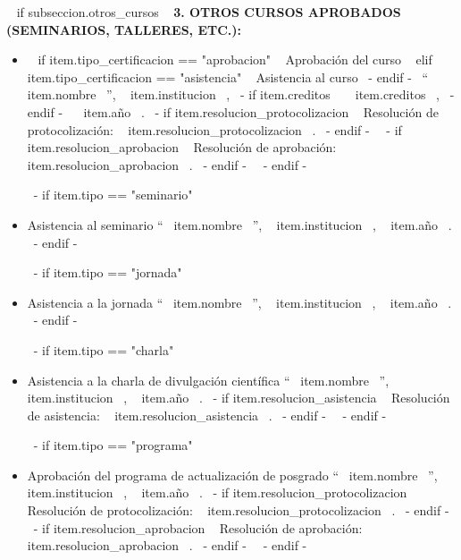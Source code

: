     ~{ if subseccion.otros_cursos }~
      \textbf{3. OTROS CURSOS APROBADOS (SEMINARIOS, TALLERES, ETC.):}
      \begin{itemize}
      ~{ for item in subseccion.otros_cursos }~
        ~{- if item.tipo == "curso" }~
          \item ~{ if item.tipo_certificacion == "aprobacion" }~ Aprobación del curso ~{ elif item.tipo_certificacion == "asistencia" }~ Asistencia al curso ~{- endif -}~
                ``~{{ item.nombre }}~'', ~{{ item.institucion }}~,
                ~{- if item.creditos }~ ~{{ item.creditos }}~, ~{- endif -}~
                ~{{ item.año }}~.
                ~{- if item.resolucion_protocolizacion }~ Resolución de protocolización: ~{{ item.resolucion_protocolizacion }}~. ~{- endif -}~
                ~{- if item.resolucion_aprobacion }~ Resolución de aprobación: ~{{ item.resolucion_aprobacion }}~. ~{- endif -}~
          \espacioEntreItems{}
        ~{- endif -}~

        ~{- if item.tipo == "seminario" }~
          \item Asistencia al seminario ``~{{ item.nombre }}~'', ~{{ item.institucion }}~, ~{{ item.año }}~.
          \espacioEntreItems{}
        ~{- endif -}~

        ~{- if item.tipo == "jornada" }~
          \item Asistencia a la jornada ``~{{ item.nombre }}~'', ~{{ item.institucion }}~, ~{{ item.año }}~.
          \espacioEntreItems{}
        ~{- endif -}~

        ~{- if item.tipo == "charla" }~
          \item Asistencia a la charla de divulgación científica ``~{{ item.nombre }}~'', ~{{ item.institucion }}~, ~{{ item.año }}~.
                ~{- if item.resolucion_asistencia }~ Resolución de asistencia: ~{{ item.resolucion_asistencia }}~. ~{- endif -}~
          \espacioEntreItems{}
        ~{- endif -}~

        ~{- if item.tipo == "programa" }~
          \item Aprobación del programa de actualización de posgrado ``~{{ item.nombre }}~'', ~{{ item.institucion }}~, ~{{ item.año }}~.
                ~{- if item.resolucion_protocolizacion }~ Resolución de protocolización: ~{{ item.resolucion_protocolizacion }}~. ~{- endif -}~
                ~{- if item.resolucion_aprobacion }~ Resolución de aprobación: ~{{ item.resolucion_aprobacion }}~. ~{- endif -}~
          \espacioEntreItems{}
        ~{- endif -}~


\end{itemize}
